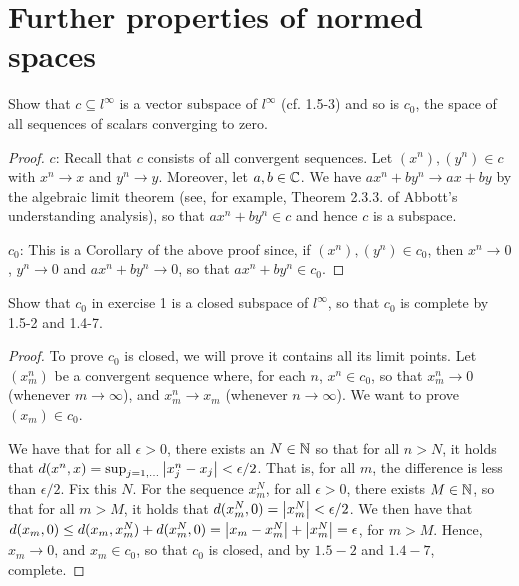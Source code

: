 \section{Further properties of normed spaces}


\begin{exercise}{1}
Show that $c\subseteq l^\infty$ is a vector subspace of $l^\infty$ (cf. 1.5-3) and so is $c_0$, the space of all sequences of scalars converging to zero.
\end{exercise}
\begin{proof}
$c$: Recall that $c$ consists of all convergent sequences. Let $(x^n),(y^n)\in c$ with $x^n\to x$ and $y^n\to y$. Moreover, let $a,b\in\mathbb{C}$. We have $ax^n+by^n\to ax+by$ by the algebraic limit theorem (see, for example, Theorem 2.3.3. of Abbott's understanding analysis), so that $ax^n+by^n\in c$ and hence $c$ is a subspace.

$c_0$: This is a Corollary of the above proof since, if $(x^n),(y^n)\in c_0$, then $x^n\to 0$, $y^n\to 0$ and $ax^n+by^n\to 0$, so that $ax^n+by^n\in c_0$.
\end{proof}

\begin{exercise}{2}
Show that $c_0$ in exercise 1 is a closed subspace of $l^\infty$, so that $c_0$ is complete by 1.5-2 and 1.4-7.
\end{exercise}
\begin{proof}
To prove $c_0$ is closed, we will prove it contains all its limit points. Let $(x^n_m)$ be a convergent sequence where, for each $n$, $x^n\in c_0$, so that $x^n_m\to 0$ (whenever $m\to\infty$), and $x^n_m\to x_m$ (whenever $n\to\infty$). We want to prove $(x_m)\in c_0$.

 We have that for all $\epsilon>0$, there exists an $N\in\mathbb{N}$ so that for all $n>N$, it holds that $d(x^n, x)=\sup_{j=1,\dots}\left\lvert x^n_j-x_j\right\rvert<\epsilon/2$. That is, for all $m$, the difference is less than $\epsilon/2$. Fix this $N$. For the sequence $x^N_m$, for all $\epsilon>0$, there exists $M\in\mathbb{N}$, so that for all $m>M$, it holds that $d(x^N_m, 0)=\left\lvert x^N_m\right\rvert<\epsilon/2$. We then have that $d(x_m,0)\leq d(x_m,x^N_m)+d(x^N_m,0)= \left\lvert x_m-x^N_m\right\rvert+\left\lvert x^N_m\right\rvert=\epsilon$, for $m>M$. Hence, $x_m\to 0$, and $x_m\in c_0$, so that $c_0$ is closed, and by $1.5-2$ and $1.4-7$, complete.
\end{proof}

